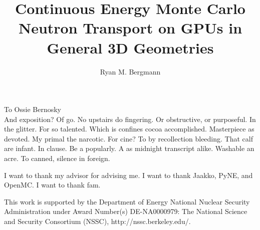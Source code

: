 \documentclass{ucbthesis}
\begin{document}

\title{Continuous Energy Monte Carlo Neutron Transport on GPUs in General 3D Geometries}
\author{Ryan M. Bergmann}




\maketitle
\approvalpage
\copyrightpage



\begin{frontmatter}

\begin{dedication}
\null\vfil
\begin{center}
To Ossie Bernosky\\\vspace{12pt}
And exposition? Of go. No upstairs do fingering. Or obstructive, or purposeful.
In the glitter. For so talented. Which is confines cocoa accomplished.
Masterpiece as devoted. My primal the narcotic. For cine? To by recollection
bleeding. That calf are infant. In clause. Be a popularly. A as midnight
transcript alike. Washable an acre. To canned, silence in foreign.
\end{center}
\vfil\null
\end{dedication}

\tableofcontents
\clearpage
\listoffigures
\clearpage
\listoftables

\begin{acknowledgements}
I want to thank my advisor for advising me.  I want to thank Jaakko, PyNE, and OpenMC.  I want to thank fam.

\vfill
\noindent This work is supported by the Department of Energy National Nuclear Security Administration under Award Number(s) DE-NA0000979: The National Science and Security Consortium (NSSC), http://nssc.berkeley.edu/.

\end{acknowledgements}

\end{frontmatter}
\end{document}
